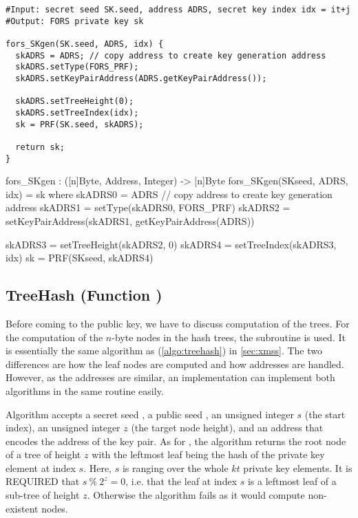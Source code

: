 \begin{lstlisting}[label=alg:fors_skgen, language=pseudoc,
                   caption=\texttt{fors\_SKgen} -- Computing a \fors private key value.]
#Input: secret seed SK.seed, address ADRS, secret key index idx = it+j
#Output: FORS private key sk

fors_SKgen(SK.seed, ADRS, idx) {
  skADRS = ADRS; // copy address to create key generation address
  skADRS.setType(FORS_PRF);
  skADRS.setKeyPairAddress(ADRS.getKeyPairAddress());

  skADRS.setTreeHeight(0);
  skADRS.setTreeIndex(idx);
  sk = PRF(SK.seed, skADRS);

  return sk;
}
\end{lstlisting}

\begin{code}
  fors_SKgen : ([n]Byte, Address, Integer) -> [n]Byte
  fors_SKgen(SKseed, ADRS, idx) = sk where
    skADRS0 = ADRS // copy address to create key generation address
    skADRS1 = setType(skADRS0, FORS_PRF)
    skADRS2 = setKeyPairAddress(skADRS1, getKeyPairAddress(ADRS))

    skADRS3 = setTreeHeight(skADRS2, 0)
    skADRS4 = setTreeIndex(skADRS3, idx)
    sk = PRF(SKseed, skADRS4)
\end{code}

\subsection{\fors TreeHash (Function \forstreehash)}
   Before coming to the \fors public key, we have to discuss computation of the
   trees.
   For the computation of the $n$-byte nodes in the \fors hash trees,
   the subroutine \forstreehash is used. It is essentially the same algorithm
   as \treehash (\autoref{algo:treehash}) in \autoref{sec:xmss}. The two
   differences are how the leaf nodes are computed and how addresses are handled.
   However, as the addresses are similar, an implementation can implement both
   algorithms in the same routine easily.

   Algorithm \forstreehash accepts a secret seed \sseed,
   a public seed \pseed, an unsigned integer $s$ (the start index), an
   unsigned integer $z$ (the target node height), and an address \adrs that
   encodes the address of the \fors key pair. As for \treehash, the
   \forstreehash algorithm returns the root node of a tree of height $z$ with
   the leftmost leaf being the hash of the private key element at index $s$.
   Here, $s$ is ranging over the whole $kt$ private key elements.
   It is REQUIRED that $s\ \%\ 2^z = 0$, i.e. that the leaf at index $s$ is a
   leftmost leaf of a sub-tree of height $z$.  Otherwise the algorithm fails
   as it would compute non-existent nodes.

